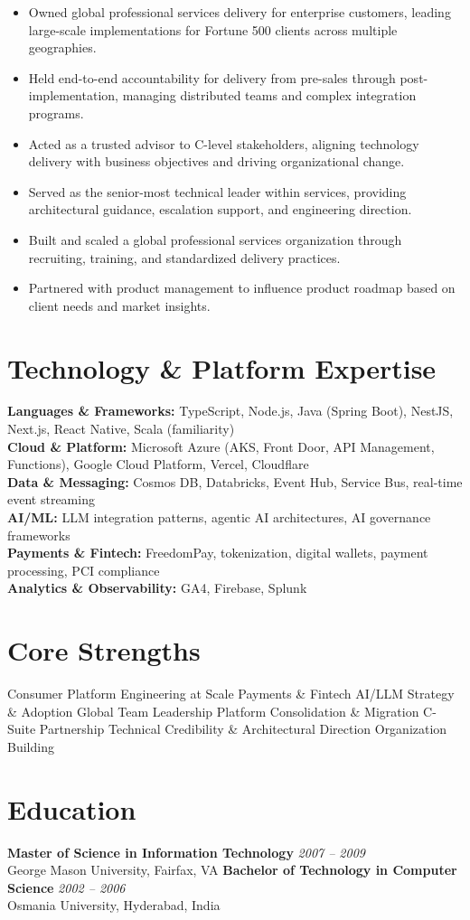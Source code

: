 \documentclass[11pt]{article}
\begin{document}
\begin{itemize}
  \item Owned global professional services delivery for enterprise customers, leading large-scale implementations for Fortune 500 clients across multiple geographies.
  \item Held end-to-end accountability for delivery from pre-sales through post-implementation, managing distributed teams and complex integration programs.
  \item Acted as a trusted advisor to C-level stakeholders, aligning technology delivery with business objectives and driving organizational change.
  \item Served as the senior-most technical leader within services, providing architectural guidance, escalation support, and engineering direction.
  \item Built and scaled a global professional services organization through recruiting, training, and standardized delivery practices.
  \item Partnered with product management to influence product roadmap based on client needs and market insights.
\end{itemize}

\section*{Technology \& Platform Expertise}
\textbf{Languages \& Frameworks:} TypeScript, Node.js, Java (Spring Boot), NestJS, Next.js, React Native, Scala (familiarity) \\
\textbf{Cloud \& Platform:} Microsoft Azure (AKS, Front Door, API Management, Functions), Google Cloud Platform, Vercel, Cloudflare \\
\textbf{Data \& Messaging:} Cosmos DB, Databricks, Event Hub, Service Bus, real-time event streaming \\
\textbf{AI/ML:} LLM integration patterns, agentic AI architectures, AI governance frameworks \\
\textbf{Payments \& Fintech:} FreedomPay, tokenization, digital wallets, payment processing, PCI compliance \\
\textbf{Analytics \& Observability:} GA4, Firebase, Splunk

\section*{Core Strengths}
Consumer Platform Engineering at Scale \textbullet{} Payments \& Fintech \textbullet{} AI/LLM Strategy \& Adoption \textbullet{} Global Team Leadership \textbullet{} Platform Consolidation \& Migration \textbullet{} C-Suite Partnership \textbullet{} Technical Credibility \& Architectural Direction \textbullet{} Organization Building

\section*{Education}
\textbf{Master of Science in Information Technology} \hfill \textit{2007 -- 2009} \\
George Mason University, Fairfax, VA
\newline
\textbf{Bachelor of Technology in Computer Science} \hfill \textit{2002 -- 2006} \\
Osmania University, Hyderabad, India
\end{document}
